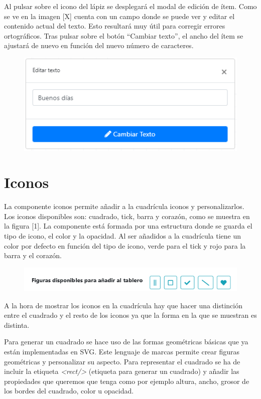 Al pulsar sobre el icono del lápiz se desplegará el modal de edición de ítem. Como se ve en la imagen [X] cuenta con un campo donde se puede ver y editar el contenido actual del texto. Esto resultará muy útil para corregir errores ortográficos. Tras pulsar sobre el botón “Cambiar texto”, el ancho del ítem se ajustará de nuevo en función del nuevo número de caracteres.

\begin{figure}[h!]
	\centering
	\includegraphics[width=0.7\linewidth]{Imagenes/Bitmap/modalEditarTexto}
	\caption{}
	\label{fig:modaleditartexto}
\end{figure}



\section{Iconos}

La componente iconos permite añadir a la cuadrícula iconos y personalizarlos. Los iconos disponibles son: cuadrado, tick, barra y corazón, como se muestra en la figura [1]. La componente está formada por una estructura donde se guarda el tipo de icono, el color y la opacidad. Al ser añadidos a la cuadrícula tiene un color por defecto en función del tipo de icono, verde para el tick y rojo para la barra y el corazón.

\begin{figure}[h!]
	\centering
	\includegraphics[width=0.7\linewidth]{Imagenes/Bitmap/herramientaItems}
	\caption{}
	\label{fig:herramientaitems}
\end{figure}


A la hora de mostrar los iconos en la cuadrícula hay que hacer una distinción entre el cuadrado y el resto de los iconos ya que la forma en la que se muestran es distinta.

Para generar un cuadrado se hace uso de las formas geométricas básicas que ya están implementadas en SVG. Este lenguaje de marcas permite crear figuras geométricas y personalizar su aspecto. Para representar el cuadrado se ha de incluir la etiqueta \textit{<rect/>} (etiqueta para generar un cuadrado) y añadir las propiedades que queremos que tenga como por ejemplo altura, ancho, grosor de los bordes del cuadrado, color u opacidad.

